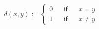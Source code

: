 \documentclass[preview]{standalone}
\begin{document}
\begin{align*}
d(x,y) := \begin{cases} 0 && \text{if} && x=y \\1 && \text{if} && x \neq y\end{cases}
\end{align*}
\end{document}
